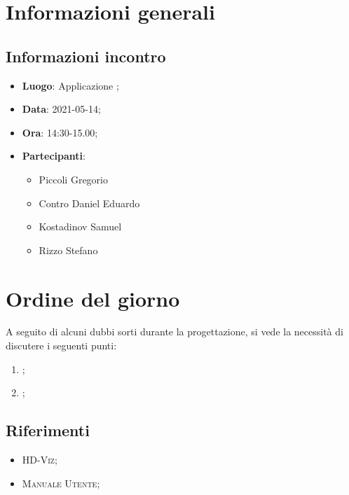 \documentclass{article}
\begin{document}


\section{Informazioni generali}
\label{sec:info_generali}

\subsection{Informazioni incontro}
\label{sub:info_incontro}

\begin{itemize}
	\item \textbf{Luogo}: Applicazione ;
	\item \textbf{Data}: 2021-05-14;
	\item \textbf{Ora}: 14:30-15.00;
	\item \textbf{Partecipanti}:
	\begin{itemize}
		\item Piccoli Gregorio
		\item Contro Daniel Eduardo
		\item Kostadinov Samuel
		\item Rizzo Stefano
		
	\end{itemize}
\end{itemize}

\section{Ordine del giorno}%
\label{sec:ordine_del_giorno}
A seguito di alcuni dubbi sorti durante la progettazione, si vede la necessità di discutere i seguenti punti:
\begin{enumerate}
	\item {};
	\item {};
\end{enumerate}


\subsection{Riferimenti}%
\label{sub:riferimenti}
\begin{itemize}
    \item \textsc{HD-Viz};
    \item \textsc{Manuale Utente};
    \end{itemize}
\end{document}
